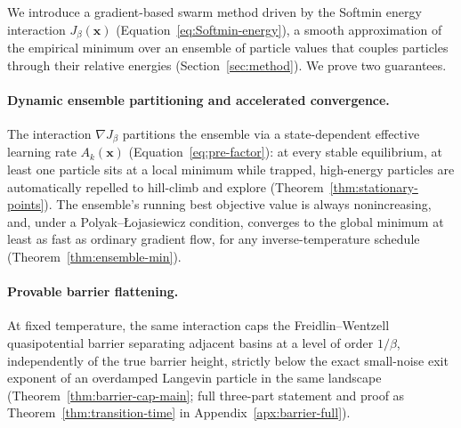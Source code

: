 \documentclass{opt2026} %
\newcommand{\prefactor}[2]{A_{#1}(#2)}
\newcommand{\xx}{\mathbf{x}}
\begin{document}
We introduce a gradient-based swarm method driven by the Softmin energy interaction $J_\beta(\xx)$ (Equation~\eqref{eq:Softmin-energy}), a smooth approximation of the empirical minimum over an ensemble of particle values that couples particles through their relative energies (Section~\ref{sec:method}). We prove two guarantees.

\paragraph{Dynamic ensemble partitioning and accelerated convergence.} The interaction $\nabla J_\beta$ partitions the ensemble via a state-dependent effective learning rate $\prefactor{k}{\xx}$ (Equation~\eqref{eq:pre-factor}): at every stable equilibrium, at least one particle sits at a local minimum while trapped, high-energy particles are automatically repelled to hill-climb and explore (Theorem~\ref{thm:stationary-points}). The ensemble's running best objective value is always nonincreasing, and, under a Polyak--\L{}ojasiewicz condition, converges to the global minimum at least as fast as ordinary gradient flow, for any inverse-temperature schedule (Theorem~\ref{thm:ensemble-min}).

\paragraph{Provable barrier flattening.} At fixed temperature, the same interaction caps the Freidlin--Wentzell quasipotential barrier separating adjacent basins at a level of order $1/\beta$, independently of the true barrier height, strictly below the exact small-noise exit exponent of an overdamped Langevin particle in the same landscape (Theorem~\ref{thm:barrier-cap-main}; full three-part statement and proof as Theorem~\ref{thm:transition-time} in Appendix~\ref{apx:barrier-full}).
\end{document}
